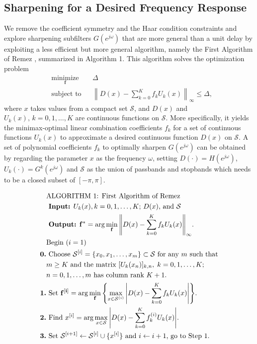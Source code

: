 \documentclass[journal] {IEEEtran}
\begin{document}
\subsection{Sharpening for a Desired Frequency Response}
We remove the coefficient symmetry and the Haar condition constraints and explore sharpening subfilters $G(e^{j\omega})$ that are more general than a unit delay by exploiting a less efficient but more general algorithm, namely the First Algorithm of Remez \cite{Cheney1966}, summarized in Algorithm 1. This algorithm solves the optimization problem
\begin{equation}\label{eqn:freqresp::general_optim}
\begin{aligned}
& \underset{\mathbf{f}}{\text{minimize}}
& & \Delta \\
& \text{subject to}
& &\left\|D(x)-\sum_{k=0}^K f_k U_k(x)\right\|_{\infty}\le \Delta,
\end{aligned}
\end{equation}
where $x$ takes values from a compact set $\mathcal{S}$, and $D(x)$ and $U_k(x),\,k=0,1,\dots,K$ are continuous functions on $\mathcal{S}$. More specifically, it yields the minimax-optimal linear combination coefficients $f_k$ for a set of continuous functions $U_k(x)$ to approximate a desired continuous function $D(x)$ on $\mathcal{S}$. A set of polynomial coefficients $f_k$ to optimally sharpen $G(e^{j\omega})$ can be obtained by regarding the parameter $x$ as the frequency $\omega$, setting $D(\cdot) = H(e^{j\omega})$, $U_k(\cdot) = G^k(e^{j\omega})$ and $\mathcal{S}$ as the union of passbands and stopbands which needs to be a closed subset of $[-\pi,\pi]$.


\begin{equation*}
\begin{aligned}
&\text{ALGORITHM 1: First Algorithm of Remez} \\
&\text{ \textbf{Input:} $U_k(x), k =0,1,\dots,K$; $D(x)$, and $\mathcal{S}$}\\
&\text{ \textbf{Output:} $\mathbf{f^{\ast}} = \arg\min_{\mathbf{f}}\left\|D(x)-\sum_{k=0}^K f_k U_k(x)\right\|_{\infty}$.}\\
&\text{Begin ($i=1$)}\\
\text{\bf{0.}}& \text{ Choose $\mathcal{S}^{[i]}=\{x_0,x_1,\dots,x_m\}\subset \mathcal{S}$ for any $m$ such that}\\
&\text{$m\ge K$ and the matrix  $[U_k(x_n)]_{k,n},\;k=0,1,\dots,K$;}\\
&\text{$n=0,1,\dots,m$ has column rank $K+1$.} \\
\text{\bf{1.}}& \text{ Set $\mathbf{f^{[i]}} = \arg\min_{\mathbf{f}} \left\{\max_{x \in \mathcal{S}^{(i)}} \left|D(x)-\sum_{k=0}^K f_k U_k(x)\right|\right\}$.}\\
\text{\bf{2.}}& \text{ Find $x^{[i]}=\arg\max_{x \in\mathcal{S}} \left|D(x)-\sum_{k=0}^K f^{(i)}_k U_k(x)\right|$.}\\
\text{\bf{3.}}& \text{ Set $\mathcal{S}^{[i+1]}\leftarrow \mathcal{S}^{[i]}\cup \{x^{[i]}\}$ and $i\leftarrow i+1$, go to Step 1.}\\
\end{aligned}
\end{equation*}
\end{document}
